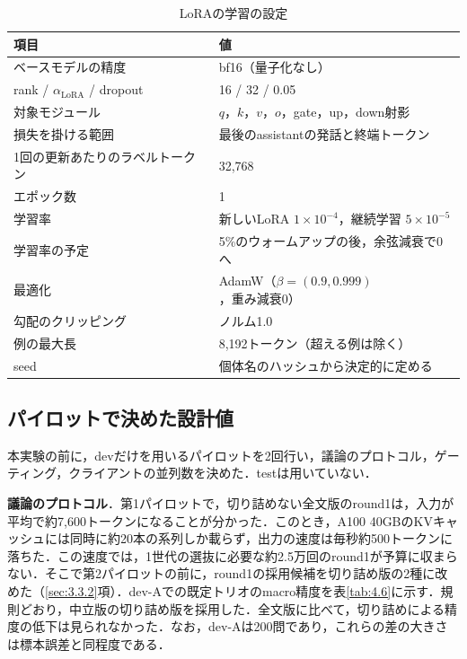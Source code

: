 \begin{table}[htbp]
\caption{LoRAの学習の設定}
\label{tab:4.5}
\centering
\small
\begin{tabular}{|l|p{8.0cm}|}
\hline
項目 & 値 \\
\hline
ベースモデルの精度 & bf16（量子化なし） \\
rank / $\alpha_{\mathrm{LoRA}}$ / dropout & 16 / 32 / 0.05 \\
対象モジュール & $q$，$k$，$v$，$o$，gate，up，down射影 \\
損失を掛ける範囲 & 最後のassistantの発話と終端トークン \\
1回の更新あたりのラベルトークン & 32,768 \\
エポック数 & 1 \\
学習率 & 新しいLoRA $1 \times 10^{-4}$，継続学習 $5 \times 10^{-5}$ \\
学習率の予定 & 5\%のウォームアップの後，余弦減衰で0へ \\
最適化 & AdamW（$\beta = (0.9, 0.999)$，重み減衰0） \\
勾配のクリッピング & ノルム1.0 \\
例の最大長 & 8,192トークン（超える例は除く） \\
seed & 個体名のハッシュから決定的に定める \\
\hline
\end{tabular}
\end{table}

\subsection{パイロットで決めた設計値}
\label{sec:4.6.2}

本実験の前に，devだけを用いるパイロットを2回行い，議論のプロトコル，ゲーティング，クライアントの並列数を決めた．testは用いていない．

\textbf{議論のプロトコル}．第1パイロットで，切り詰めない全文版のround1は，入力が平均で約7,600トークンになることが分かった．このとき，A100 40GBのKVキャッシュには同時に約20本の系列しか載らず，出力の速度は毎秒約500トークンに落ちた．この速度では，1世代の選抜に必要な約2.5万回のround1が予算に収まらない．そこで第2パイロットの前に，round1の採用候補を切り詰め版の2種に改めた（\ref{sec:3.3.2}項）．dev-Aでの既定トリオのmacro精度を表\ref{tab:4.6}に示す．規則どおり，中立版の切り詰め版を採用した．全文版に比べて，切り詰めによる精度の低下は見られなかった．なお，dev-Aは200問であり，これらの差の大きさは標本誤差と同程度である．

